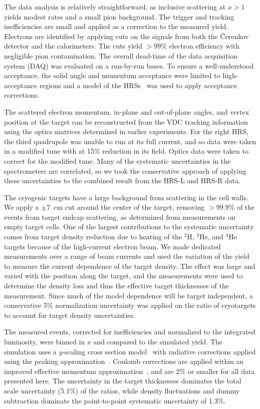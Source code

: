 \documentclass[aps,prl,superscriptaddress,showpacs,twocolumn,floatfix,amsmath,amssymb]{revtex4-1}
\begin{document}

The data analysis is relatively straightforward, as inclusive scattering at $x>1$ yields modest rates and a
small pion background. The trigger and tracking inefficiencies are small and applied as a correction to the
measured yield. Electrons are identified by applying cuts on the signals from both the \v{C}erenkov detector
and the calorimeters. The cuts yield $>99$\% electron efficiency with negligible pion contamination. The
overall dead-time of the data acquisition system (DAQ) was evaluated on a run-by-run bases. To ensure a
well-understood acceptance, the solid angle and momentum acceptance were limited to high-acceptance regions
and a model of the HRSs~\cite{zye_thesis} was used to apply acceptance corrections.

The scattered electron momentum, in-plane and out-of-plane angles, and vertex position at the target can be
reconstructed from the VDC tracking information using the optics matrices determined in earlier experiments.
For the right HRS, the third quadrupole was unable to run at its full current, and so data were taken in a
modified tune with at 15\% reduction in its field. Optics data were taken to correct for the modified
tune. Many of the systematic uncertainties in the spectrometers are correlated, so we took the
conservative approach of applying these uncertainties to the combined result from the HRS-L and HRS-R data.


The cryogenic targets have a large background from scattering in the cell walls. We apply a $\pm 7$~cm
cut around the center of the target, removing $>99.9\%$ of the events from target endcap
scattering, as determined from measurements on empty target cells. One of the largest contributions to the
systematic uncertainty comes from target density reduction due to heating of the $^2$H, $^3$He, and $^4$He
targets because of the high-current electron beam. We made dedicated measurements over a range of
beam currents and used the variation of the yield to measure the current dependence of the target density.
The effect was large and varied with the position along the target, and the measurements were used to
determine the density loss and thus the effective target thicknesses of the measurement. Since much 
of the model dependence will be target independent, a conservative 5\% normalization uncertainty was applied
on the ratio of cryotargets to account for target density uncertainties.

The measured events, corrected for inefficiencies and normalized to the integrated luminosity, were binned
in $x$ and compared to the simulated yield. The simulation uses a $y$-scaling cross section
model~\cite{day_arns, arrington99} with radiative corrections applied using the peaking
approximation~\cite{zye_thesis, stein75}. Coulomb corrections are applied within an improved effective
momentum approximation~\cite{aste05,arrington12}, and are 2\% or smaller for all data presented here. The
uncertainty in the target thicknesses dominates the total scale uncertainty (5.1\%) of the ratios, while
density fluctuations and dummy subtraction dominate the point-to-point systematic uncertainty of 1.3\%.
\end{document}
